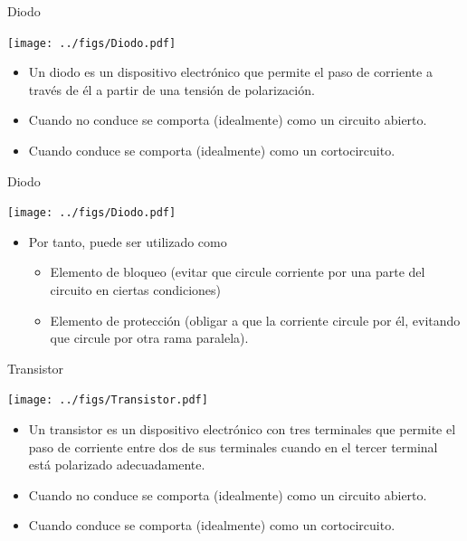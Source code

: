 \documentclass[xcolor={usenames,svgnames,dvipsnames}]{beamer}
\begin{document}
\begin{frame}[label={sec:org17fd876}]{Diodo}
\begin{center}
\texttt{[image: ../figs/Diodo.pdf]}
\end{center}

\begin{itemize}
\item Un diodo es un dispositivo electrónico que permite el paso de
corriente a través de él a partir de una tensión de polarización.

\item Cuando \alert{no conduce} se comporta (idealmente) como un \alert{circuito abierto}.

\item Cuando \alert{conduce} se comporta (idealmente) como un \alert{cortocircuito}.
\end{itemize}
\end{frame}

\begin{frame}[label={sec:orgf5ae161}]{Diodo}
\begin{center}
\texttt{[image: ../figs/Diodo.pdf]}
\end{center}

\begin{itemize}
\item Por tanto, puede ser utilizado como

\begin{itemize}
\item \alert{Elemento de bloqueo} (evitar que circule corriente por una parte
del circuito en ciertas condiciones)

\item \alert{Elemento de protección} (obligar a que la corriente circule por
él, evitando que circule por otra rama paralela).
\end{itemize}
\end{itemize}
\end{frame}

\begin{frame}[label={sec:org2a1da4a}]{Transistor}
\begin{center}
\texttt{[image: ../figs/Transistor.pdf]}
\end{center}

\begin{itemize}
\item Un transistor es un dispositivo electrónico con tres terminales que
permite el paso de corriente entre dos de sus terminales cuando en el
tercer terminal está polarizado adecuadamente.

\item Cuando \alert{no conduce} se comporta (idealmente) como un \alert{circuito abierto}.

\item Cuando \alert{conduce} se comporta (idealmente) como un \alert{cortocircuito}.
\end{itemize}
\end{frame}
\end{document}
